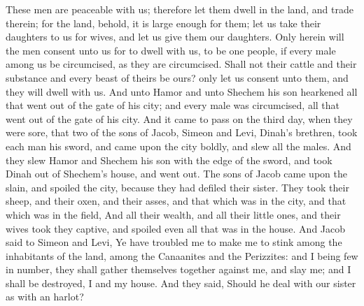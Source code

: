 \begin{biblechapter}
\verse These men are peaceable with us; therefore let them dwell in the land, and trade therein; for the land, behold, it is large enough for them; let us take their daughters to us for wives, and let us give them our daughters.
\verse Only herein will the men consent unto us for to dwell with us, to be one people, if every male among us be circumcised, as they are circumcised.
\verse Shall not their cattle and their substance and every beast of theirs be ours? only let us consent unto them, and they will dwell with us.
\verse And unto Hamor and unto Shechem his son hearkened all that went out of the gate of his city; and every male was circumcised, all that went out of the gate of his city.
\verse And it came to pass on the third day, when they were sore, that two of the sons of Jacob, Simeon and Levi, Dinah's brethren, took each man his sword, and came upon the city boldly, and slew all the males.
\verse And they slew Hamor and Shechem his son with the edge of the sword, and took Dinah out of Shechem's house, and went out.
\verse The sons of Jacob came upon the slain, and spoiled the city, because they had defiled their sister.
\verse They took their sheep, and their oxen, and their asses, and that which was in the city, and that which was in the field,
\verse And all their wealth, and all their little ones, and their wives took they captive, and spoiled even all that was in the house.
\verse And Jacob said to Simeon and Levi, Ye have troubled me to make me to stink among the inhabitants of the land, among the Canaanites and the Perizzites: and I being few in number, they shall gather themselves together against me, and slay me; and I shall be destroyed, I and my house.
\verse And they said, Should he deal with our sister as with an harlot?
\end{biblechapter}


